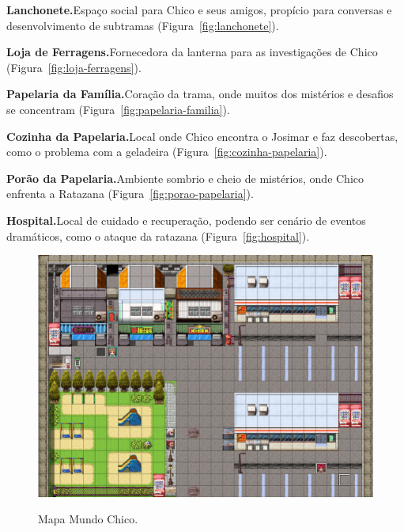 \medskip\noindent \textbf{Lanchonete.}\quad Espaço social para Chico e seus amigos, propício para conversas e desenvolvimento de subtramas (Figura~\ref{fig:lanchonete}).

\medskip\noindent \textbf{Loja de Ferragens.}\quad Fornecedora da lanterna para as investigações de Chico (Figura~\ref{fig:loja-ferragens}).

\medskip\noindent \textbf{Papelaria da Família.}\quad Coração da trama, onde muitos dos mistérios e desafios se concentram (Figura~\ref{fig:papelaria-familia}).

\medskip\noindent \textbf{Cozinha da Papelaria.}\quad Local onde Chico encontra o Josimar e faz descobertas, como o problema com a geladeira (Figura~\ref{fig:cozinha-papelaria}).

\medskip\noindent \textbf{Porão da Papelaria.}\quad Ambiente sombrio e cheio de mistérios, onde Chico enfrenta a Ratazana (Figura~\ref{fig:porao-papelaria}).

\medskip\noindent \textbf{Hospital.}\quad Local de cuidado e recuperação, podendo ser cenário de eventos dramáticos, como o ataque da ratazana (Figura~\ref{fig:hospital}).


\begin{figure}[!htbp]
	\centering
	\caption{Mapa Mundo Chico.}
	\includegraphics[scale=0.4]{Textuais/Pictures/Mundo_chico.png}
	\label{fig:mundo-chico}
\end{figure}


